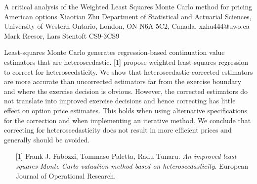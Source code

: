 \begin{talk}
\end{talk}

\begin{talk}
  {A critical analysis of the Weighted Least Squares Monte Carlo method for pricing American options}%
  {Xiaotian Zhu}%
  {Department of Statistical and Actuarial Sciences, University of Western Ontario, London, ON N6A 5C2, Canada. }%
  {xzhu444@uwo.ca}%
  {Mark Reesor,  Lars Stentoft}%
{}{}{CS9-3}{CS9}

			
Least-squares Monte Carlo generates regression-based continuation value estimators that are heteroscedastic. [1] propose weighted least-squares regression to correct for heteroscedsticity. We show that heteroscedastic-corrected estimators are more accurate than uncorrected estimators far from the exercise boundary and where the exercise decision is obvious. However, the corrected estimators do not translate into improved exercise decisions and hence correcting has little effect on option price estimates. This holds when using alternative specifications for the correction and when implementing an iterative method. We conclude that correcting for heteroscedasticity does not result in more efficient prices and generally should be avoided.

\medskip


\begin{enumerate}
	\item[{[1]}] Frank J. Fabozzi, Tommaso Paletta, Radu Tunaru. {\it An improved least squares Monte Carlo valuation method based on heteroscedasticity}. European Journal of Operational Research.
\end{enumerate}

\end{talk}

